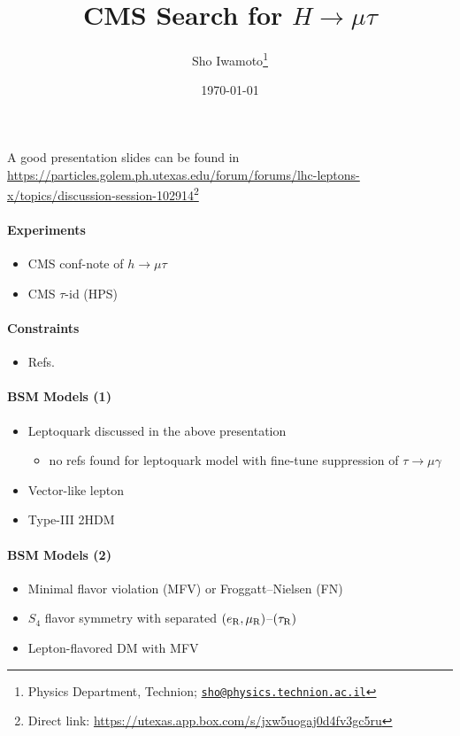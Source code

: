 \documentclass[10pt,a4paper]{article}
\title{CMS Search for $H\to\mu\tau$}
\author{Sho Iwamoto\thanks{Physics Department, Technion; \href{mailto:sho@physics.technion.ac.il}{\tt sho@physics.technion.ac.il}}}
\date{\mydate\today}
\newcommand{\s}[1]{_{\rm #1}}
\begin{document}
\maketitle

A good presentation slides can be found in \url{https://particles.golem.ph.utexas.edu/forum/forums/lhc-leptons-x/topics/discussion-session-102914}\footnote{Direct link: \url{https://utexas.app.box.com/s/jxw5uogaj0d4fv3gc5ru}}

\paragraph{Experiments}
\begin{itemize}
 \item CMS conf-note of $h\to\mu\tau$ \cite{CMSPASHIG14005}
 \item CMS $\tau$-id (HPS) \cite{Chatrchyan:2012zz}
\end{itemize}

\paragraph{Constraints}
\begin{itemize}
 \item Refs.~\cite{Blankenburg:2012ex,Harnik:2012pb}
\end{itemize}

\paragraph{BSM Models (1)}
\begin{itemize}
 \item Leptoquark discussed in the above presentation
\begin{itemize}
 \item  no refs found for leptoquark model with fine-tune suppression of $\tau\to\mu\gamma$
\end{itemize}
 \item Vector-like lepton \cite{Falkowski:2013jya}
 \item Type-III 2HDM \cite{Sierra:2014nqa}
\end{itemize}

\paragraph{BSM Models (2)}
\begin{itemize}
 \item Minimal flavor violation (MFV) or Froggatt--Nielsen (FN) \cite{Dery:2014kxa}
 \item $S_4$ flavor symmetry with separated $(e\s R,\mu\s R)$--$(\tau\s R)$ \cite{Campos:2014zaa}
 \item Lepton-flavored DM with MFV \cite{Lee:2014rba}
\end{itemize}
\newpage

\end{document}
